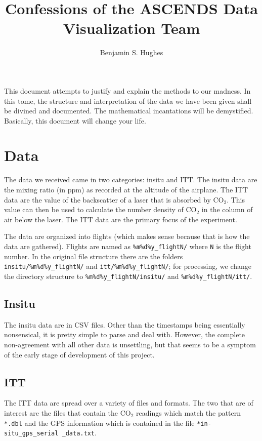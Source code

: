 \documentclass[12pt]{article}
\begin{document}
\author{Benjamin S. Hughes}
\title{Confessions of the ASCENDS Data Visualization Team}
\maketitle

This document attempts to justify and explain the methods to our madness.  In this tome, the structure and interpretation of the data we have been given shall be divined and documented.  The mathematical incantations will be demystified.  Basically, this document will change your life.

\section*{Data}

The data we received came in two categories: insitu and ITT.  The insitu data are the mixing ratio (in ppm) as recorded at the altitude of the airplane. The ITT data are the value of the backscatter of a laser that is absorbed by CO$_2$. This value can then be used to calculate the number density of CO$_2$ in the column of air below the laser.  The ITT data are the primary focus of the experiment.

The data are organized into flights (which makes sense because that is how the data are gathered).  Flights are named as \texttt{\%m\%d\%y\_flightN/} where \texttt{N} is the flight number.  In the original file structure there are the folders \texttt{insitu/\%m\%d\%y\_flightN/} and \texttt{itt/\%m\%d\%y\_flightN/}; for processing, we change the directory structure to \texttt{\%m\%d\%y\_flightN/insitu/} and \texttt{\%m\%d\%y\_flightN/itt/}.

\subsection*{Insitu}

The insitu data are in CSV files.  Other than the timestamps being essentially nonsensical, it is pretty simple to parse and deal with.  However, the complete non-agreement with all other data is unsettling, but that seems to be a symptom of the early stage of development of this project.

\subsection*{ITT}

The ITT data are spread over a variety of files and formats.  The two that are of interest are the files that contain the CO$_2$ readings which match the pattern \texttt{*.dbl} and the GPS information which is contained in the file \texttt{*in-situ\_gps\_serial \_data.txt}.
\end{document}
